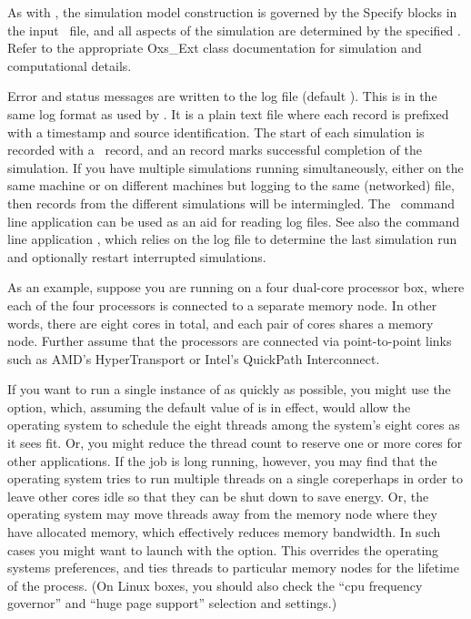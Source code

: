 As with , the simulation model construction is governed by
the Specify blocks in the input \MIF\ file, and all aspects of the
simulation are determined by the specified
.
Refer to the appropriate Oxs\_Ext class documentation for simulation and
computational details.

Error and status messages are written to the log file
(default ). This is in the same log format as
used by . It is a plain text file where each
record is prefixed with a timestamp and source identification. The start
of each simulation is recorded with a \ record, and
an  record marks successful completion of the simulation. If you
have multiple simulations running simultaneously, either on the same
machine or on different machines but logging to the same (networked)
file, then records from the different simulations will be
intermingled. The \OOMMF\ command line application
 can be used as an
aid for reading  log files. See also the command line
application
, which relies on the
log file to determine the last simulation run and optionally restart
interrupted simulations.

As an example, suppose you are running on a four dual-core processor
box, where each of the four processors is connected to a separate memory
node.  In other words, there are eight cores in total, and each pair of
cores shares a memory node.  Further assume that the processors are
connected via point-to-point links such as AMD's HyperTransport or
Intel's QuickPath Interconnect.

If you want to run a single instance of  as quickly as
possible, you might use the  option, which, assuming the
default value of  is in effect, would allow the
operating system to schedule the eight threads among the system's eight
cores as it sees fit.  Or, you might reduce the thread count to reserve
one or more cores for other applications.  If the job is long running,
however, you may find that the operating system tries to run multiple
threads on a single core\emdash perhaps in order to leave other cores idle so
that they can be shut down to save energy.  Or, the operating system may
move threads away from the memory node where they have allocated memory,
which effectively reduces memory bandwidth.  In such cases you might want
to launch  with the  option.  This
overrides the operating systems preferences, and ties threads to
particular memory nodes for the lifetime of the process.  (On Linux
boxes, you should also check the ``cpu frequency governor'' and ``huge page
support'' selection and settings.)

